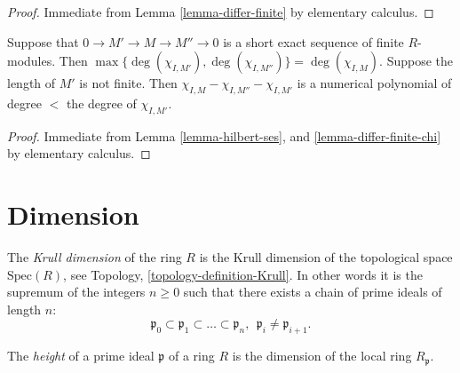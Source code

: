 \begin{proof}
Immediate from Lemma \ref{lemma-differ-finite} by elementary calculus.
\end{proof}

\begin{lemma}
\label{lemma-hilbert-ses-chi}
Suppose that $0 \to M' \to M \to M'' \to 0$
is a short exact sequence of finite $R$-modules.
Then $\max\{ \deg(\chi_{I, M'}), \deg(\chi_{I, M''}) \}
= \deg(\chi_{I, M})$.
Suppose the length of $M'$ is not finite.
Then $\chi_{I,M} - \chi_{I, M''} - \chi_{I,M'}$
is a numerical polynomial of degree $<$ the degree of
$\chi_{I,M'}$.
\end{lemma}

\begin{proof}
Immediate from Lemma \ref{lemma-hilbert-ses}, and 
\ref{lemma-differ-finite-chi} by elementary calculus.
\end{proof}



































\section{Dimension}
\label{section-dimension}

\begin{definition}
\label{definition-Krull}
The {\it Krull dimension} of the ring $R$ is the 
Krull dimension of the topological space $\text{Spec}(R)$,
see Topology, \ref{topology-definition-Krull}.
In other words it is the supremum of the integers $n\geq 0$
such that there exists a chain of prime ideals of length $n$:
$$
\mathfrak p_0
\subset 
\mathfrak p_1
\subset
\ldots
\subset
\mathfrak p_n,\ \ 
\mathfrak p_i \not= \mathfrak p_{i+1}.
$$
\end{definition}

\begin{definition}
\label{definition-height}
The {\it height} of a prime ideal $\mathfrak p$ of
a ring $R$ is the dimension of the local ring $R_{\mathfrak p}$.
\end{definition}

